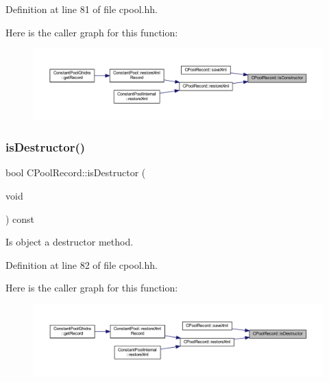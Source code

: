 Definition at line 81 of file cpool.\+hh.

Here is the caller graph for this function\+:
\nopagebreak
\begin{figure}[H]
\begin{center}
\leavevmode
\includegraphics[width=350pt]{class_c_pool_record_a7ab36868403f7334cbd764bd57ac78a7_icgraph}
\end{center}
\end{figure}
\mbox{\label{class_c_pool_record_a87a39ecd1ef52ece95ee9a5290827ce4}} 
\subsubsection{\texorpdfstring{isDestructor()}{isDestructor()}}
{\footnotesize\ttfamily bool C\+Pool\+Record\+::is\+Destructor (\begin{DoxyParamCaption}\item[{void}]{ }\end{DoxyParamCaption}) const\hspace{0.3cm}{\ttfamily [inline]}}



Is object a destructor method. 



Definition at line 82 of file cpool.\+hh.

Here is the caller graph for this function\+:
\nopagebreak
\begin{figure}[H]
\begin{center}
\leavevmode
\includegraphics[width=350pt]{class_c_pool_record_a87a39ecd1ef52ece95ee9a5290827ce4_icgraph}
\end{center}
\end{figure}
\mbox{\label{class_c_pool_record_a93e21b4afa8d1db68152b7d6e56c3413}} 
